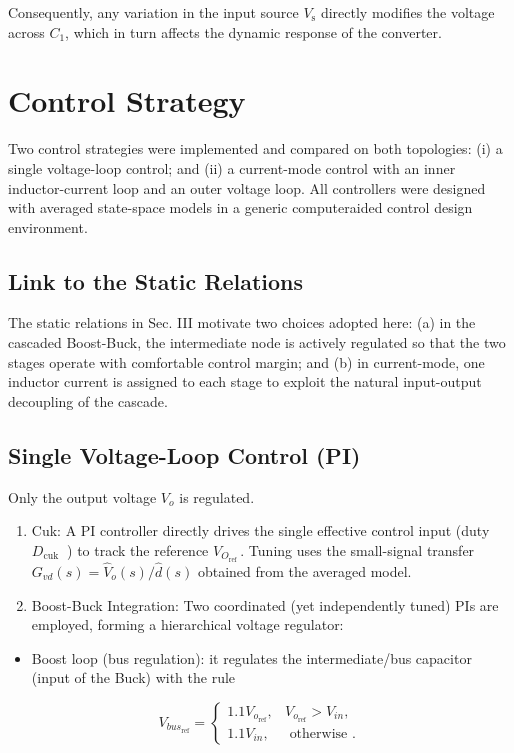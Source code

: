 \documentclass[10pt,conference]{IEEEtran}
\begin{document}
Consequently, any variation in the input source $V_{\mathrm{s}}$ directly modifies the voltage across $C_{1}$, which in turn affects the dynamic response of the converter.

\section[V]{Control Strategy}
Two control strategies were implemented and compared on both topologies: (i) a single voltage-loop control; and (ii) a current-mode control with an inner inductor-current loop and an outer voltage loop. All controllers were designed with averaged state-space models in a generic computeraided control design environment.

\subsection[A]{Link to the Static Relations}
The static relations in Sec. III motivate two choices adopted here: (a) in the cascaded Boost-Buck, the intermediate node is actively regulated so that the two stages operate with comfortable control margin; and (b) in current-mode, one inductor current is assigned to each stage to exploit the natural input-output decoupling of the cascade.

\subsection[B]{Single Voltage-Loop Control (PI)}
Only the output voltage $V_{o}$ is regulated.

\begin{enumerate}
  \item Cuk: A PI controller directly drives the single effective control input (duty $D_{\text {cuk }}$ ) to track the reference $V_{O_{\text {ref }}}$. Tuning uses the small-signal transfer $G_{v d}(s)=\hat{V}_{o}(s) / \hat{d}(s)$ obtained from the averaged model.
  \item Boost-Buck Integration: Two coordinated (yet independently tuned) PIs are employed, forming a hierarchical voltage regulator:
\end{enumerate}

\begin{itemize}
  \item Boost loop (bus regulation): it regulates the intermediate/bus capacitor (input of the Buck) with the rule
\end{itemize}
\begin{equation}
V_{b u s_{\mathrm{ref}}}= \begin{cases}1.1 V_{o_{\mathrm{ref}}}, & V_{o_{\mathrm{ref}}}>V_{i n}, \\ 1.1 V_{i n}, & \text { otherwise } .\end{cases}
\label{eqn12}\end{equation}
\end{document}
